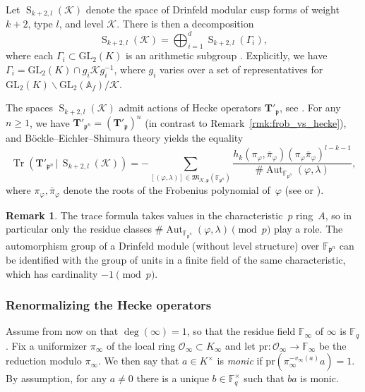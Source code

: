 \documentclass[10pt]{article}
\theoremstyle{definition}
\newtheorem{remark}[theorem]{Remark}
\let\phi\varphi
\DeclareMathOperator\Aut{Aut}
\DeclareMathOperator\Tr{Tr}
\renewcommand{\:}{\colon}
\newcommand{\T}{\mathbf{T}}
\renewcommand{\S}{\operatorname{S}}
\newcommand{\bF}{\mathbb{F}}
\begin{document}
Let $\S_{k+2,l}({\mathcal K})$ denote the space of Drinfeld modular cusp forms of weight $k+2$, type $l$, and level ${\mathcal K}$. There is then a decomposition
\[
\S_{k+2,l}(\mathcal K) = \bigoplus_{i=1}^d \S_{k+2,l}(\Gamma_i),
\]
where each $\Gamma_i \subset \mathrm{GL}_2(K)$ is an arithmetic subgroup \cite[Lemma 4.14]{bockle}.
Explicitly, we have $\Gamma_i = \mathrm{GL}_2(K) \cap g_i \mathcal K g_i^{-1}$, where $g_i$ varies over a set of representatives for $\mathrm{GL}_2(K) \backslash \mathrm{GL}_2(\mathbb A_f) / \mathcal K$.

The spaces $\S_{k+2,l}(\mathcal K)$ admit actions of Hecke operators $\T'_{\mathfrak p}$, see \cite[Section~6]{bockle}. For any $n \geq 1$, we have $\T'_{\mathfrak p^n} = (\T'_{\mathfrak p})^n$ (in contrast to Remark~\ref{rmk:frob_vs_hecke}), and B\"ockle--Eichler--Shimura theory yields the equality \cite[Remark~4.12]{devries_ramanujan}
\begin{equation}\label{eq:traceformula_dmf}
\Tr(\T'_{\mathfrak p^n} \, | \, \S_{k+2,l}({\mathcal K})) = -\sum_{[(\phi,\lambda)] \in \mathfrak M_{{\mathcal K},\mathfrak p}(\mathbb F_{\mathfrak p^n})} \frac{h_k(\pi_{\phi},\bar{\pi}_{\phi}) (\pi_{\phi}\bar{\pi}_{\phi})^{l-k-1}}{\# \Aut_{\mathbb F_{\mathfrak p^n}}(\phi,\lambda)},
\end{equation}
where $\pi_{\phi},\bar{\pi}_{\phi}$ denote the roots of the Frobenius polynomial of~$\phi$ (see \cite[Chapter~4.2]{papikian} or \cite{gek_finite}).

\begin{remark}\label{rmk:aut=-1}
    The trace formula takes values in the characteristic~$p$ ring~$A$, so in particular only the residue classes $\# \Aut_{\mathbb F_{\mathfrak p^n}}(\phi,\lambda) \pmod{p}$ play a role. The automorphism group of a Drinfeld module (without level structure) over $\bF_{\mathfrak p^n}$ can be identified with the group of units in a finite field of the same characteristic, which has cardinality $-1 \pmod{p}$.
\end{remark}

\subsubsection{Renormalizing the Hecke operators}

Assume from now on that $\deg(\infty) = 1$, so that the residue field $\mathbb F_\infty$ of $\infty$ is $\mathbb F_q$. Fix a uniformizer $\pi_\infty$ of the local ring $\mathcal O_\infty \subset K_\infty$ and let $\text{pr}:\mathcal O_\infty \to \mathbb F_\infty$ be the reduction modulo $\pi_\infty$. We then say that $a \in K^\times$ is \emph{monic} if $\text{pr}(\pi_\infty^{-v_\infty(a)}a) = 1$. By assumption, for any $a \neq 0$ there is a unique $b \in \mathbb F_q^\times$ such that $ba$ is monic.
\end{document}
